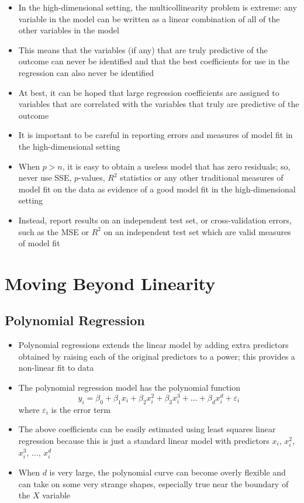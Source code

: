 \documentclass[12pt]{article}
\begin{document}
\begin{itemize}
\item In the high-dimensional setting, the multicollinearity problem is extreme: any variable in the model can be written as a linear combination of all of the other variables in the model
\item This means that the variables (if any) that are truly predictive of the outcome can never be identified and that the best coefficients for use in the regression can also never be identified 
\item At best, it can be hoped that large regression coefficients are assigned to variables that are correlated with the variables that truly are predictive of the outcome 
\item It is important to be careful in reporting errors and measures of model fit in the high-dimensional setting 
\item When $p > n$, it is easy to obtain a useless model that has zero residuals; so, never use SSE, $p$-values, $R^2$ statistics or any other traditional measures of model fit on the data as evidence of a good model fit in the high-dimensional setting 
\item Instead, report results on an independent test set, or cross-validation errors, such as the MSE or $R^2$ on an independent test set which are valid measures of model fit 
\end{itemize}

\section{Moving Beyond Linearity}
\subsection{Polynomial Regression}
\begin{itemize} 
\item Polynomial regressions extends the linear model by adding extra predictors obtained by raising each of the original predictors to a power; this provides a non-linear fit to data
\item The polynomial regression model has the polynomial function
$$ y_i = \beta_0 + \beta_1x_i + \beta_2x_i^2 + \beta_3x_i^3 + \dots + \beta_dx_i^d + \varepsilon_i $$ where $\varepsilon_i$ is the error term
\item The above coefficients can be easily estimated using least squares linear regression because this is just a standard linear model with predictors $x_i$, $x_i^2$, $x_i^3$, $\dots$, $x_i^d$
\item When $d$ is very large, the polynomial curve can become overly flexible and can take on some very strange shapes, especially true near the boundary of the $X$ variable 
\end{itemize}
\end{document}
